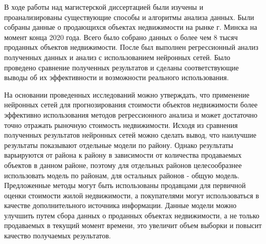


В ходе работы над магистерской диссертацией были изучены и проанализированы существующие способы и алгоритмы анализа
данных. Были собраны данные о продающихся объектах недвижимости на рынке г. Минска на момент конца 2020 года.
Всего было собрано данных о более чем 8 тысяч проданных объектов недвижимости. После был выполнен регрессионный анализ
полученных данных и анализ с использованием нейронных сетей. Было проведено сравнение полученных результатов и сделаны
соответствующие выводы об их эффективности и возможности реального использования.

На основании проведенных исследований можно утверждать, что применение нейронных сетей для прогнозирования
стоимости объектов недвижимости более эффективно использования методов регрессионного анализа и может достаточно
точно отражать рыночную стоимость недвижимости. Исходя из сравнения полученных результатов нейронных сетей можно сделать
вывод, что наилучшие результаты показывают отдельные
модели по району. Однако результаты варьируются от района к району в зависимости от количества продаваемых объектов
в данном районе, поэтому для отдельных районов целесообразнее использовать модель по районам, для остальных районов - 
общую модель.
Предложенные методы могут быть использованы продавцами для первичной оценки стоимости жилой недвижимости,
а покупателями могут использоваться в качестве дополнительного источника информации. Данные модели можно улучшить
путем сбора данных о проданных объектах недвижимости, а не только продаваемых в текущий момент времени, это увеличит
объем выборки и повысит качество получаемых результатов.
